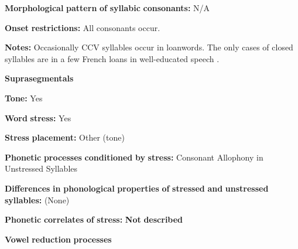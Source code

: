 \documentclass[output=paper]{langsci/langscibook}
\begin{document}
\begin{styleBody}
\textbf{Morphological} \textbf{pattern} \textbf{of} \textbf{syllabic} \textbf{consonants:} N/A
\end{styleBody}

\begin{styleBody}
\textbf{Onset} \textbf{restrictions:} All consonants occur.
\end{styleBody}

\begin{styleBody}
\textbf{Notes:} Occasionally CCV syllables occur in loanwords. The only cases of closed syllables are in a few French loans in well-educated speech \citep[113]{Morse1976}.
\end{styleBody}

\begin{styleBody}
\textbf{Suprasegmentals}
\end{styleBody}

\begin{styleBody}
\textbf{Tone:} Yes
\end{styleBody}

\begin{styleBody}
\textbf{Word} \textbf{stress:} Yes
\end{styleBody}

\begin{styleBody}
\textbf{Stress} \textbf{placement:} Other (tone)
\end{styleBody}

\begin{styleBody}
\textbf{Phonetic} \textbf{processes} \textbf{conditioned} \textbf{by} \textbf{stress:} Consonant Allophony in Unstressed Syllables
\end{styleBody}

\begin{styleBody}
\textbf{Differences} \textbf{in} \textbf{phonological} \textbf{properties} \textbf{of} \textbf{stressed} \textbf{and} \textbf{unstressed} \textbf{syllables:} (None)
\end{styleBody}

\begin{styleBody}
\textbf{Phonetic} \textbf{correlates} \textbf{of} \textbf{stress:} \textbf{Not} \textbf{described}
\end{styleBody}

\begin{styleBody}
\textbf{Vowel} \textbf{reduction} \textbf{processes}
\end{styleBody}
\end{document}
